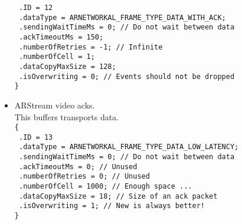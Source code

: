 \begin{itemize}
{    \texttt{  .ID = 12}\\
    \texttt{  .dataType = ARNETWORKAL\_FRAME\_TYPE\_DATA\_WITH\_ACK;}\\
    \texttt{  .sendingWaitTimeMs = 0; // Do not wait between data}\\
    \texttt{  .ackTimeoutMs = 150;}\\
    \texttt{  .numberOfRetries = -1; // Infinite}\\
    \texttt{  .numberOfCell = 1;}\\
    \texttt{  .dataCopyMaxSize = 128;}\\
    \texttt{  .isOverwriting = 0; // Events should not be dropped}\\
    \texttt{\}}
}
\item{
    ARStream video acks.\\
    This buffers transports  data.\\
    \texttt{\{}\\
    \texttt{  .ID = 13}\\
    \texttt{  .dataType = ARNETWORKAL\_FRAME\_TYPE\_DATA\_LOW\_LATENCY;}\\
    \texttt{  .sendingWaitTimeMs = 0; // Do not wait between data}\\
    \texttt{  .ackTimeoutMs = 0; // Unused}\\
    \texttt{  .numberOfRetries = 0; // Unused}\\
    \texttt{  .numberOfCell = 1000; // Enough space ...}\\
    \texttt{  .dataCopyMaxSize = 18; // Size of an ack packet}\\
    \texttt{  .isOverwriting = 1; // New is always better!}\\
    \texttt{\}}
}
\end{itemize}



